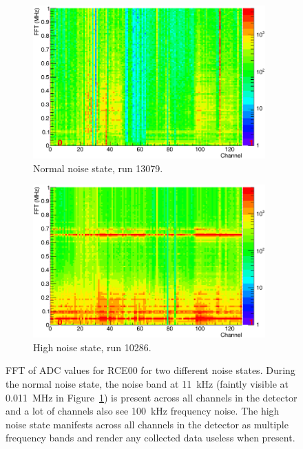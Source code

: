 \begin{figure}
  \centering
  \begin{subfigure}[t]{0.48\linewidth}
    \centering
    \includegraphics[width=0.98\textwidth]{FFTRun13079.png}
    \caption{Normal noise state, run 13079.}
    \label{fig:NormalNoiseState}
  \end{subfigure}
  \hfill
  \begin{subfigure}[t]{0.48\linewidth}
    \centering
    \includegraphics[width=0.98\textwidth]{FFTRun10286.png}
    \caption{High noise state, run 10286.}
    \label{fig:HighNoiseState}
  \end{subfigure}
  \caption[FFT of ADC values for RCE00 for two different noise states.]{FFT of ADC values for RCE00 for two different noise states.  During the normal noise state, the noise band at 11~kHz (faintly visible at 0.011~MHz in Figure~\ref{fig:NormalNoiseState}) is present across all channels in the detector and a lot of channels also see 100~kHz frequency noise.  The high noise state manifests across all channels in the detector as multiple frequency bands and render any collected data useless when present.}
  \label{fig:NoiseStates}
\end{figure}

